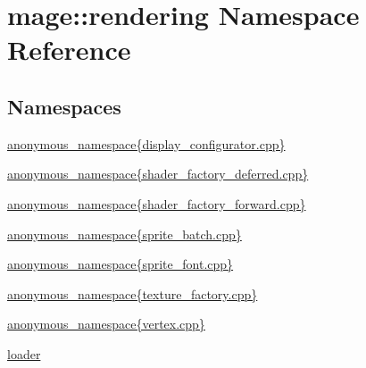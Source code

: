 \hypertarget{namespacemage_1_1rendering}{}\section{mage\+:\+:rendering Namespace Reference}
\label{namespacemage_1_1rendering}
\subsection*{Namespaces}
\begin{DoxyCompactItemize}
\item 
 \mbox{\hyperlink{namespacemage_1_1rendering_1_1anonymous__namespace_02display__configurator_8cpp_03}{anonymous\+\_\+namespace\{display\+\_\+configurator.\+cpp\}}}
\item 
 \mbox{\hyperlink{namespacemage_1_1rendering_1_1anonymous__namespace_02shader__factory__deferred_8cpp_03}{anonymous\+\_\+namespace\{shader\+\_\+factory\+\_\+deferred.\+cpp\}}}
\item 
 \mbox{\hyperlink{namespacemage_1_1rendering_1_1anonymous__namespace_02shader__factory__forward_8cpp_03}{anonymous\+\_\+namespace\{shader\+\_\+factory\+\_\+forward.\+cpp\}}}
\item 
 \mbox{\hyperlink{namespacemage_1_1rendering_1_1anonymous__namespace_02sprite__batch_8cpp_03}{anonymous\+\_\+namespace\{sprite\+\_\+batch.\+cpp\}}}
\item 
 \mbox{\hyperlink{namespacemage_1_1rendering_1_1anonymous__namespace_02sprite__font_8cpp_03}{anonymous\+\_\+namespace\{sprite\+\_\+font.\+cpp\}}}
\item 
 \mbox{\hyperlink{namespacemage_1_1rendering_1_1anonymous__namespace_02texture__factory_8cpp_03}{anonymous\+\_\+namespace\{texture\+\_\+factory.\+cpp\}}}
\item 
 \mbox{\hyperlink{namespacemage_1_1rendering_1_1anonymous__namespace_02vertex_8cpp_03}{anonymous\+\_\+namespace\{vertex.\+cpp\}}}
\item 
 \mbox{\hyperlink{namespacemage_1_1rendering_1_1loader}{loader}}
\end{DoxyCompactItemize}
